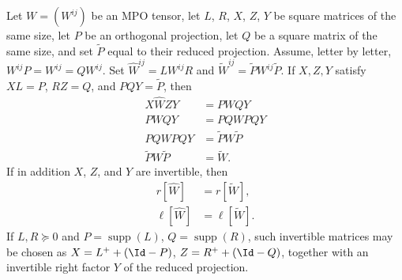 \begin{lemma}
    \label{thm:mpu_reduced_to_hat_source_ranks}
    \leanok
    Let $W=(W^{ij})$ be an MPO tensor, let $L$, $R$, $X$, $Z$, $Y$ be square
    matrices of the same size, let $P$ be an orthogonal projection, let $Q$
    be a square matrix of the same size, and set $\widetilde P$ equal to
    their reduced projection.
    Assume, letter by letter, $W^{ij}P=W^{ij}=QW^{ij}$. Set
    $\widehat W^{ij}=LW^{ij}R$ and
    $\widetilde W^{ij}=\widetilde P W^{ij}\widetilde P$. If $X,Z,Y$ satisfy
    $XL=P$, $RZ=Q$, and $PQY=\widetilde P$, then
    \begin{align}
        X\widehat W ZY             & =PWQY
        \label{eq:mpu_reduced_hat_chain_pwqy}                    \\
        PWQY                       & =PQWPQY
        \label{eq:mpu_reduced_hat_chain_pqwpqy}                  \\
        PQWPQY                     & =\widetilde P W\widetilde P
        \label{eq:mpu_reduced_hat_chain_reduced}                 \\
        \widetilde P W\widetilde P & =\widetilde W.
        \label{eq:mpu_reduced_hat_chain_tilde}
    \end{align}
    If in addition $X$, $Z$, and $Y$ are invertible, then
    \begin{align}
        r[\widehat W]    & =r[\widetilde W],\label{eq:mpu_reduced_hat_right_rank} \\
        \ell[\widehat W] & =\ell[\widetilde W].
        \label{eq:mpu_reduced_hat_left_rank}
    \end{align} If $L,R\succeq0$ and
    $P=\operatorname{supp}(L)$, $Q=\operatorname{supp}(R)$, such invertible
    matrices may be chosen as $X=L^++(\Id-P)$, $Z=R^++(\Id-Q)$, together
    with an invertible right factor $Y$ of the reduced projection.
\end{lemma}

